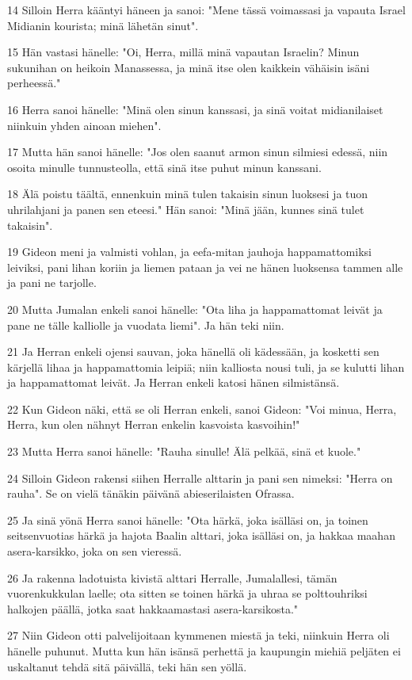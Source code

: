 \par 14 Silloin Herra kääntyi häneen ja sanoi: "Mene tässä voimassasi ja vapauta Israel Midianin kourista; minä lähetän sinut".
\par 15 Hän vastasi hänelle: "Oi, Herra, millä minä vapautan Israelin? Minun sukunihan on heikoin Manassessa, ja minä itse olen kaikkein vähäisin isäni perheessä."
\par 16 Herra sanoi hänelle: "Minä olen sinun kanssasi, ja sinä voitat midianilaiset niinkuin yhden ainoan miehen".
\par 17 Mutta hän sanoi hänelle: "Jos olen saanut armon sinun silmiesi edessä, niin osoita minulle tunnusteolla, että sinä itse puhut minun kanssani.
\par 18 Älä poistu täältä, ennenkuin minä tulen takaisin sinun luoksesi ja tuon uhrilahjani ja panen sen eteesi." Hän sanoi: "Minä jään, kunnes sinä tulet takaisin".
\par 19 Gideon meni ja valmisti vohlan, ja eefa-mitan jauhoja happamattomiksi leiviksi, pani lihan koriin ja liemen pataan ja vei ne hänen luoksensa tammen alle ja pani ne tarjolle.
\par 20 Mutta Jumalan enkeli sanoi hänelle: "Ota liha ja happamattomat leivät ja pane ne tälle kalliolle ja vuodata liemi". Ja hän teki niin.
\par 21 Ja Herran enkeli ojensi sauvan, joka hänellä oli kädessään, ja kosketti sen kärjellä lihaa ja happamattomia leipiä; niin kalliosta nousi tuli, ja se kulutti lihan ja happamattomat leivät. Ja Herran enkeli katosi hänen silmistänsä.
\par 22 Kun Gideon näki, että se oli Herran enkeli, sanoi Gideon: "Voi minua, Herra, Herra, kun olen nähnyt Herran enkelin kasvoista kasvoihin!"
\par 23 Mutta Herra sanoi hänelle: "Rauha sinulle! Älä pelkää, sinä et kuole."
\par 24 Silloin Gideon rakensi siihen Herralle alttarin ja pani sen nimeksi: "Herra on rauha". Se on vielä tänäkin päivänä abieserilaisten Ofrassa.
\par 25 Ja sinä yönä Herra sanoi hänelle: "Ota härkä, joka isälläsi on, ja toinen seitsenvuotias härkä ja hajota Baalin alttari, joka isälläsi on, ja hakkaa maahan asera-karsikko, joka on sen vieressä.
\par 26 Ja rakenna ladotuista kivistä alttari Herralle, Jumalallesi, tämän vuorenkukkulan laelle; ota sitten se toinen härkä ja uhraa se polttouhriksi halkojen päällä, jotka saat hakkaamastasi asera-karsikosta."
\par 27 Niin Gideon otti palvelijoitaan kymmenen miestä ja teki, niinkuin Herra oli hänelle puhunut. Mutta kun hän isänsä perhettä ja kaupungin miehiä peljäten ei uskaltanut tehdä sitä päivällä, teki hän sen yöllä.
